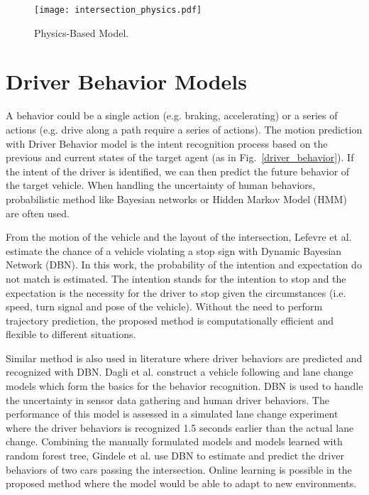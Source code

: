 \begin{figure}[htbp]
\begin{center}
\texttt{[image: intersection\_physics.pdf]}
\end{center}
\caption{Physics-Based Model.}
\label{physics-based} 
\end{figure}


\section{Driver Behavior Models}
\label{Literature:Driver Behavior}
A behavior could be a single action (e.g. braking, accelerating) or a series of actions (e.g. drive along a path require a series of actions). The motion prediction with Driver Behavior model is the intent recognition process based on the previous and current states of the target agent (as in Fig.~\ref{driver_behavior}). If the intent of the driver is identified, we can then predict the future behavior of the target vehicle. When handling the uncertainty of human behaviors, probabilistic method like Bayesian networks or Hidden Markov Model (HMM) are often used.

From the motion of the vehicle and the layout of the intersection, Lefevre et al. \cite{Lefevre2012} estimate the chance of a vehicle violating a stop sign with Dynamic Bayesian Network (DBN). In this work, the probability of the intention and expectation do not match is estimated. The intention stands for the intention to stop and the expectation is the necessity for the driver to stop given the circumstances (i.e. speed, turn signal and pose of the vehicle). Without the need to perform trajectory prediction, the proposed method is computationally efficient and flexible to different situations. 

Similar method is also used in literature where driver behaviors are predicted and recognized with DBN. Dagli et al. \cite{Dagli2003} construct a vehicle following and lane change models which form the basics for the behavior recognition. DBN is used to handle the uncertainty in sensor data gathering and human driver behaviors. The performance of this model is assessed in a simulated lane change experiment where the driver behaviors is recognized 1.5 seconds earlier than the actual lane change. Combining the manually formulated models and models learned with  random forest tree, Gindele et al. \cite{Gindele2013} use DBN to estimate and predict the driver behaviors of two cars passing the intersection. Online learning is possible in the proposed method where the model would be able to adapt to new environments.

